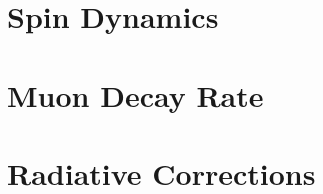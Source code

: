 \documentclass{outhesis}
\begin{document}



\appendix
\setcounter{chapter}{0}  %
 \chapter{Spin Dynamics}
 \label{app:bmt}
 \chapter{Muon Decay Rate}
 \label{app:muon}
 \chapter{Radiative Corrections}
 \label{app:schwinger}


\end{document}

